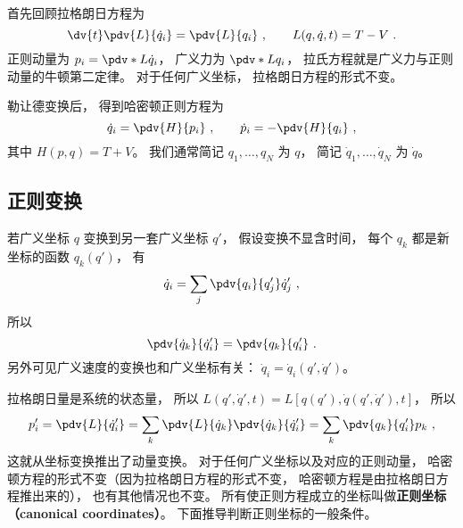 
\begin{issues}
\issueDraft
\end{issues}


首先回顾拉格朗日方程为
\begin{equation}
\dv{t} \pdv{L}{\dot q_i}  = \pdv{L}{q_i} ~, \qquad L(q,\dot q, t) = T - V~.
\end{equation}
正则动量为 $p_i = \pdv*{L}{\dot q_i}$， 广义力为 $\pdv*{L}{q_i}$，  拉氏方程就是广义力与正则动量的牛顿第二定律。 对于任何广义坐标， 拉格朗日方程的形式不变。

勒让德变换后， 得到哈密顿正则方程为
\begin{equation}
\dot q_i = \pdv{H}{p_i} ~,\qquad
\dot p_i = -\pdv{H}{q_i}~,
\end{equation} 
其中 $H(p,q) = T + V$。 我们通常简记 $q_1, \dots, q_N$ 为 $q$， 简记 $\dot q_1, \dots, \dot q_N$ 为 $\dot q$。

\subsection{正则变换}

若广义坐标 $q$ 变换到另一套广义坐标 $q'$， 假设变换不显含时间， 每个 $q_k$ 都是新坐标的函数 $q_k(q')$， 有
\begin{equation}
\dot q_i = \sum_j \pdv{q_i}{q'_j} \dot q'_j~,
\end{equation}
所以
\begin{equation}
\pdv{\dot q_k}{\dot q'_i} = \pdv{q_k}{q'_i}~.
\end{equation}
另外可见广义速度的变换也和广义坐标有关： $\dot q_i = \dot q_i(q', \dot q')$。

拉格朗日量是系统的状态量， 所以 $L(q',\dot q', t) = L[q(q'),\dot q(q',\dot q'), t]$，  所以
\begin{equation}
p'_i = \pdv{L}{\dot q'_i} = \sum_k \pdv{L}{\dot q_k} \pdv{\dot q_k}{\dot q'_i}  = \sum_k \pdv{q_k}{q'_i} p_k~,
\end{equation}
这就从坐标变换推出了动量变换。 对于任何广义坐标以及对应的正则动量， 哈密顿方程的形式不变（因为拉格朗日方程的形式不变， 哈密顿方程是由拉格朗日方程推出来的）， 也有其他情况也不变。 所有使正则方程成立的坐标叫做\textbf{正则坐标（canonical coordinates）}。 下面推导判断正则坐标的一般条件。

